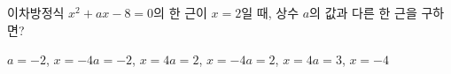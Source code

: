 이차방정식 $x^2+ax-8=0$의 한 근이 $x=2$일 때, 상수 $a$의 값과 다른 한 근을 구하면?
\begin{choicesii}{$a=-2$, $x=-4$}{$a=-2$, $x=4$}{$a=2$, $x=-4$}{$a=2$, $x=4$}{$a=3$, $x=-4$}\end{choicesii}
